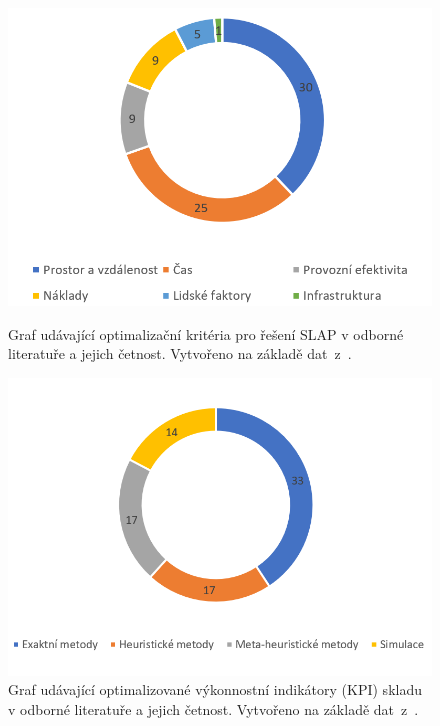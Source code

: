 \begin{figure}[t]
    \centering
    \begin{minipage}{0.49\textwidth}
        \centering
        \includegraphics[width=1\textwidth]{figures/slap_ea/pristupyReseniSlapGraf.png}
        \caption{Graf udávající optimalizační kritéria pro řešení SLAP v odborné literatuře a jejich četnost. Vytvořeno na základě dat~z~\cite{slapReview}.}
        \label{fig:grafPristupy}
    \end{minipage}\hfill
    \begin{minipage}{0.49\textwidth}
        \centering
        \includegraphics[width=1\textwidth]{figures/slap_ea/vykonnostniMeritkoGraf.png}
        \caption{Graf udávající optimalizované výkonnostní indikátory (KPI) skladu v odborné literatuře a jejich četnost. Vytvořeno na základě dat~z~\cite{slapReview}.}
        \label{fig:grafMeritka}
    \end{minipage}\hfill
\end{figure}

